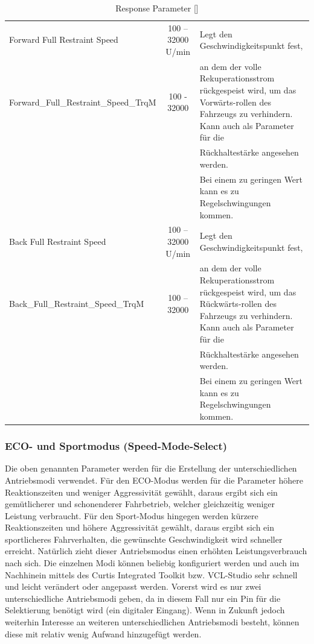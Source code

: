 \begin{table}[H]
\begin{tabular}{|lcp{6cm}|}
		Forward Full Restraint Speed & 100 – 32000 U/min & Legt den Geschwindigkeitspunkt fest,\\   Forward\_Full\_Restraint\_Speed\_TrqM & 100 - 32000 & an dem der volle Rekuperationsstrom rückgespeist wird, um das Vorwärts-rollen des Fahrzeugs zu verhindern. Kann auch als Parameter für die              \\&&Rückhaltestärke angesehen werden.\\&& Bei einem zu geringen Wert kann es zu Regelschwingungen kommen.  \\\hline
		Back Full Restraint Speed & 100 – 32000 U/min & Legt den Geschwindigkeitspunkt fest,\\ 		Back\_Full\_Restraint\_Speed\_TrqM & 100 – 32000 & an dem der volle Rekuperationsstrom rückgespeist wird, um das Rückwärts-rollen des Fahrzeugs zu verhindern. Kann auch als Parameter für die 				\\&&Rückhaltestärke angesehen werden.\\&& Bei einem zu geringen Wert kann es zu Regelschwingungen kommen. \\\hline		
	\end{tabular}	
	\caption{Response Parameter [\cite{Manual}]}
	\label{tab:Reaktions-Parameter}
\end{table}


\newpage

\subsubsection{ECO- und Sportmodus (Speed-Mode-Select)}
Die oben genannten Parameter werden für die Erstellung der unterschiedlichen Antriebsmodi verwendet. Für den ECO-Modus werden für die Parameter höhere Reaktionszeiten und weniger Aggressivität gewählt, daraus ergibt sich ein gemütlicherer und schonenderer Fahrbetrieb, welcher gleichzeitig weniger Leistung verbraucht. Für den Sport-Modus hingegen werden kürzere Reaktionszeiten und höhere Aggressivität gewählt, daraus ergibt sich ein sportlicheres Fahrverhalten, die gewünschte Geschwindigkeit wird schneller erreicht. Natürlich zieht dieser Antriebsmodus einen erhöhten Leistungsverbrauch nach sich. Die einzelnen Modi können beliebig konfiguriert werden und auch im Nachhinein mittels des Curtis Integrated Toolkit bzw. VCL-Studio sehr schnell und leicht verändert oder angepasst werden. Vorerst wird es nur zwei unterschiedliche Antriebsmodi geben, da in diesem Fall nur ein Pin für die Selektierung benötigt wird (ein digitaler Eingang). Wenn in Zukunft jedoch weiterhin Interesse an weiteren unterschiedlichen Antriebsmodi besteht, können diese mit relativ wenig Aufwand hinzugefügt werden.

